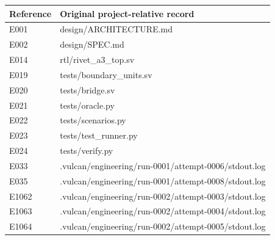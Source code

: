 \documentclass[11pt,a4paper]{article}
\begin{document}
{\small\renewcommand{\arraystretch}{1.18}\begin{longtable}{@{}L{0.12\textwidth}|L{0.82\textwidth}@{}}\toprule

\textbf{Reference} & \textbf{Original project-relative record}\\\midrule\endhead

E001 & design/\allowbreak{}ARCHITECTURE.md\\[2pt]\hline

E002 & design/\allowbreak{}SPEC.md\\[2pt]\hline

E014 & rtl/\allowbreak{}rivet\_\allowbreak{}a3\_\allowbreak{}top.sv\\[2pt]\hline

E019 & tests/\allowbreak{}boundary\_\allowbreak{}units.sv\\[2pt]\hline

E020 & tests/\allowbreak{}bridge.sv\\[2pt]\hline

E021 & tests/\allowbreak{}oracle.py\\[2pt]\hline

E022 & tests/\allowbreak{}scenarios.py\\[2pt]\hline

E023 & tests/\allowbreak{}test\_\allowbreak{}runner.py\\[2pt]\hline

E024 & tests/\allowbreak{}verify.py\\[2pt]\hline

E033 & .vulcan/\allowbreak{}engineering/\allowbreak{}run-0001/\allowbreak{}attempt-0006/\allowbreak{}stdout.log\\[2pt]\hline

E035 & .vulcan/\allowbreak{}engineering/\allowbreak{}run-0001/\allowbreak{}attempt-0008/\allowbreak{}stdout.log\\[2pt]\hline

E1062 & .vulcan/\allowbreak{}engineering/\allowbreak{}run-0002/\allowbreak{}attempt-0003/\allowbreak{}stdout.log\\[2pt]\hline

E1063 & .vulcan/\allowbreak{}engineering/\allowbreak{}run-0002/\allowbreak{}attempt-0004/\allowbreak{}stdout.log\\[2pt]\hline

E1064 & .vulcan/\allowbreak{}engineering/\allowbreak{}run-0002/\allowbreak{}attempt-0005/\allowbreak{}stdout.log\\[2pt]\hline


\end{longtable}}
\end{document}
